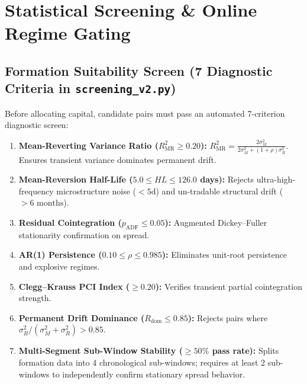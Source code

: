 \documentclass[11pt, a4paper]{article}
\begin{document}
\section{Statistical Screening \& Online Regime Gating}

\subsection{Formation Suitability Screen (7 Diagnostic Criteria in \texttt{screening\_v2.py})}
Before allocating capital, candidate pairs must pass an automated 7-criterion diagnostic screen:
\begin{enumerate}
    \item \textbf{Mean-Reverting Variance Ratio ($R^2_{\text{MR}} \ge 0.20$):}  
    $R^2_{\text{MR}} = \frac{2\sigma_M^2}{2\sigma_M^2 + (1+\rho)\sigma_R^2}$. Ensures transient variance dominates permanent drift.
    \item \textbf{Mean-Reversion Half-Life ($5.0 \le HL \le 126.0$ days):}  
    Rejects ultra-high-frequency microstructure noise ($<5\text{d}$) and un-tradable structural drift ($>6\text{ months}$).
    \item \textbf{Residual Cointegration ($p_{\text{ADF}} \le 0.05$):} Augmented Dickey--Fuller stationarity confirmation on spread.
    \item \textbf{AR(1) Persistence ($0.10 \le \rho \le 0.985$):} Eliminates unit-root persistence and explosive regimes.
    \item \textbf{Clegg--Krauss PCI Index ($\ge 0.20$):} Verifies transient partial cointegration strength.
    \item \textbf{Permanent Drift Dominance ($R_{\text{dom}} \le 0.85$):} Rejects pairs where $\sigma_R^2 / (\sigma_M^2 + \sigma_R^2) > 0.85$.
    \item \textbf{Multi-Segment Sub-Window Stability ($\ge 50\%$ pass rate):} Splits formation data into 4 chronological sub-windows; requires at least 2 sub-windows to independently confirm stationary spread behavior.
\end{enumerate}
\end{document}
